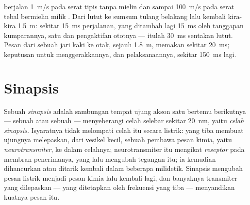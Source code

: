 \begin{example}[Kelajuan]\label{ex:g12:stretch-reflex:speed}
 berjalan \qty{1}{m/s} pada serat tipis tanpa mielin dan
sampai \qty{100}{m/s} pada serat tebal bermielin milik .
Dari lutut ke sumsum tulang belakang lalu kembali kira-kira
\qty{1.5}{m}: sekitar \qty{15}{ms} perjalanan, yang ditambah lagi
\qty{15}{ms} oleh tanggapan kumparannya, satu  dan pengaktifan
ototnya --- itulah \qty{30}{ms} sentakan lutut. Pesan dari sebuah jari
kaki ke otak, sejauh \qty{1.8}{m}, memakan sekitar \qty{20}{ms};
keputusan untuk menggerakkannya, dan pelaksanaannya, sekitar
\qty{150}{ms} lagi.
\end{example}

\section{Sinapsis}

\begin{definition}\label{def:g12:stretch-reflex:synapse}
Sebuah \emph{sinapsis} adalah sambungan tempat ujung
akson satu  bertemu  berikutnya --- sebuah  atau sebuah
 --- menyeberangi celah selebar sekitar \qty{20}{nm}, yaitu
\emph{celah sinapsis}. Isyaratnya tidak melompati celah itu secara
listrik:  yang tiba membuat ujungnya melepaskan, dari
vesikel kecil, sebuah pembawa pesan kimia, yaitu
\emph{neurotransmiter}, ke dalam celahnya;
neurotransmiter itu mengikat \emph{reseptor} pada membran 
penerimanya, yang lalu mengubah tegangan  itu; ia kemudian
dihancurkan atau ditarik kembali dalam beberapa milidetik. Sinapsis
mengubah pesan listrik menjadi pesan kimia lalu kembali lagi, dan
banyaknya transmiter yang dilepaskan --- yang ditetapkan oleh frekuensi
 yang tiba --- menyandikan kuatnya pesan itu.
\end{definition}

